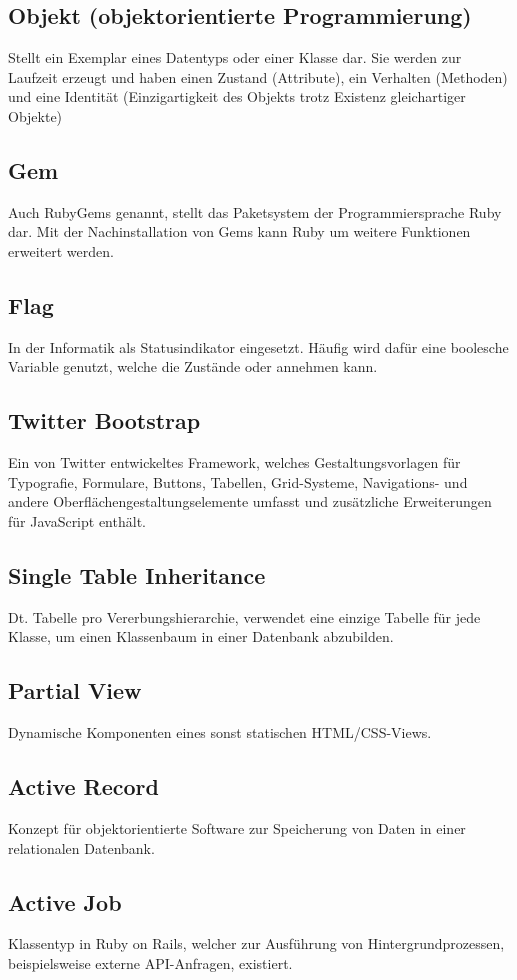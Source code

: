 \subsection*{Objekt (objektorientierte Programmierung)}
Stellt ein Exemplar eines Datentyps oder einer Klasse dar. Sie werden zur Laufzeit erzeugt und haben
einen Zustand (Attribute), ein Verhalten (Methoden) und eine Identität (Einzigartigkeit des Objekts trotz
Existenz gleichartiger Objekte)
\subsection*{Gem}
Auch RubyGems genannt, stellt das Paketsystem der Programmiersprache Ruby dar. Mit der Nachinstallation
von Gems kann Ruby um weitere Funktionen erweitert werden.
\subsection*{Flag}
In der Informatik als Statusindikator eingesetzt. Häufig wird dafür eine boolesche Variable genutzt,
welche die Zustände  oder  annehmen kann.
\subsection*{Twitter Bootstrap}
Ein von Twitter entwickeltes Framework, welches Gestaltungsvorlagen für
Typografie, Formulare, Buttons, Tabellen, Grid-Systeme, Navigations- und andere
Oberflächengestaltungselemente umfasst und zusätzliche Erweiterungen für JavaScript enthält.
\subsection*{Single Table Inheritance}
Dt. Tabelle pro Vererbungshierarchie, verwendet eine einzige Tabelle für jede Klasse, um einen
Klassenbaum in einer Datenbank abzubilden.
\subsection*{Partial View}
Dynamische Komponenten eines sonst statischen HTML/CSS-Views.
\subsection*{Active Record}
Konzept für objektorientierte Software zur Speicherung von Daten in einer relationalen
Datenbank.
\subsection*{Active Job}
Klassentyp in Ruby on Rails, welcher zur Ausführung von Hintergrundprozessen, beispielsweise
externe API-Anfragen, existiert.
